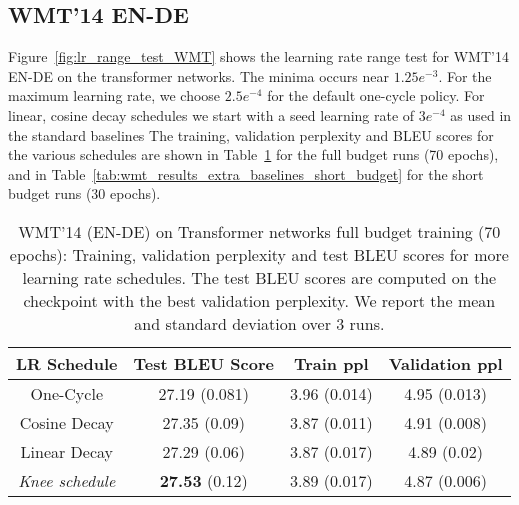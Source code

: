 \documentclass[twoside,11pt]{article}
\newcommand{\lrschedule}{\textit{Knee schedule}}
\begin{document}
\subsection{WMT'14 EN-DE}
Figure~\ref{fig:lr_range_test_WMT} shows the learning rate range test for WMT'14 EN-DE on the transformer networks. The minima occurs near $1.25e^{-3}$. For the maximum learning rate, we choose $2.5e^{-4}$ for the default one-cycle policy. For linear, cosine decay schedules we start with a seed learning rate of $3e^{-4}$ as used in the standard baselines The training, validation perplexity and BLEU scores for the various schedules are shown in Table~\ref{tab:wmt_results_extra_baselines_full_budget} for the full budget runs (70 epochs), and in Table~\ref{tab:wmt_results_extra_baselines_short_budget} for the short budget runs (30 epochs).

\begin{table}[h]
\small
\centering
\caption{WMT'14 (EN-DE) on Transformer networks full budget training (70 epochs): Training, validation perplexity and test BLEU scores for more learning rate schedules. The test BLEU scores are computed on the checkpoint with the best validation perplexity. We report the mean and standard deviation over 3 runs.}
\label{tab:wmt_results_extra_baselines_full_budget}
\begin{tabular}{cccc}
  \toprule
  LR Schedule   & Test BLEU Score  & Train ppl & Validation ppl   \\ 
  \midrule 
  One-Cycle     &  27.19 (0.081)    & 3.96 (0.014)  & 4.95 (0.013)     \\
  Cosine Decay  &  27.35 (0.09)     & 3.87 (0.011)   & 4.91 (0.008)   \\
  Linear Decay  &  27.29 (0.06)     & 3.87 (0.017)   & 4.89 (0.02)   \\
  \lrschedule{} & \textbf{27.53} (0.12)      & 3.89 (0.017)   & 4.87 (0.006)    \\ 
  \bottomrule
\end{tabular}

\end{table}
\end{document}
